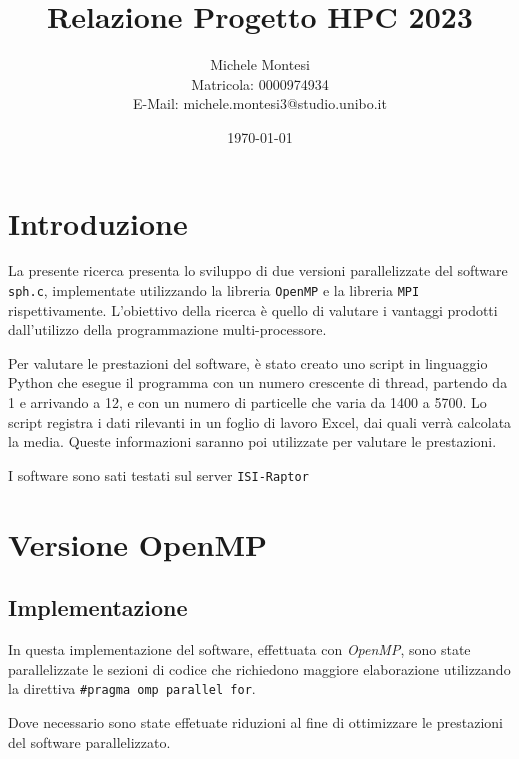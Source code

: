 \documentclass[a4paper, 12pt]{report}
\title{Relazione Progetto HPC 2023}
\author{Michele Montesi \\
        Matricola: 0000974934 \\
        E-Mail: michele.montesi3@studio.unibo.it}
\date{\today}
\begin{document}
\maketitle

\chapter*{Introduzione}
\begin{sloppypar}
La presente ricerca presenta lo sviluppo di due versioni parallelizzate del software \texttt{sph.c}, 
implementate utilizzando la libreria \texttt{OpenMP} e la libreria \texttt{MPI} rispettivamente. 
L'obiettivo della ricerca è quello di valutare i vantaggi prodotti dall'utilizzo della programmazione multi-processore.
\end{sloppypar}

\bigskip

\begin{sloppypar}
\noindent
Per valutare le prestazioni del software, è stato creato uno script in linguaggio Python che esegue il programma 
con un numero crescente di thread, partendo da 1 e arrivando a 12, e con un numero di particelle che varia da 1400 
a 5700. Lo script registra i dati rilevanti in un foglio di lavoro Excel, dai quali verrà calcolata la media.
Queste informazioni saranno poi utilizzate per valutare le prestazioni.

\bigskip
\noindent
I software sono sati testati sul server \texttt{ISI-Raptor}

\end{sloppypar}

{\let\clearpage\relax\chapter*{Versione OpenMP}}
\section*{Implementazione}
\begin{sloppypar}
  \noindent
  In questa implementazione del software, effettuata con \textit{OpenMP}, sono state parallelizzate le sezioni di codice
  che richiedono maggiore elaborazione utilizzando la direttiva \texttt{\#pragma omp parallel for}.

  \smallskip
  \noindent
  Dove necessario sono state effetuate riduzioni al fine di ottimizzare le prestazioni del software parallelizzato.
\end{sloppypar}
\end{document}
